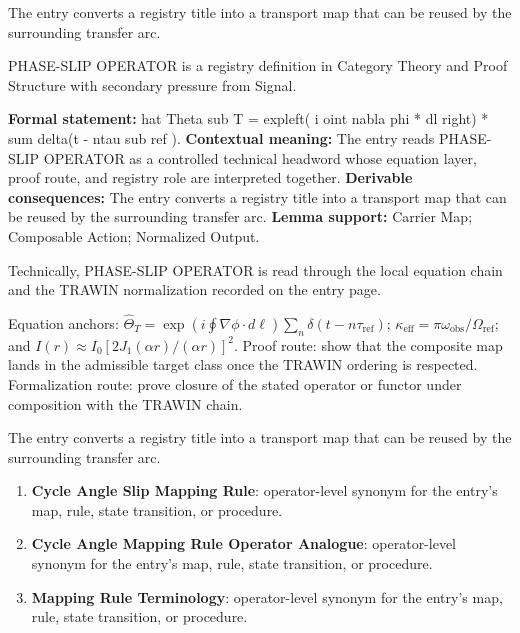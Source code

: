 The entry converts a registry title into a transport map that can be reused by the surrounding transfer arc.
\clearpage


\begingroup\small
{}
PHASE-SLIP OPERATOR is a registry definition in Category Theory and Proof Structure with secondary pressure from Signal.

\begingroup\footnotesize\setlength{\emergencystretch}{3em}\sloppy
\textbf{Formal statement:} hat Theta sub T = expleft( i oint nabla phi * dl right) * sum delta(t - ntau sub ref ). \textbf{Contextual meaning:} The entry reads PHASE-SLIP OPERATOR as a controlled technical headword whose equation layer, proof route, and registry role are interpreted together. \textbf{Derivable consequences:} The entry converts a registry title into a transport map that can be reused by the surrounding transfer arc. \textbf{Lemma support:} Carrier Map; Composable Action; Normalized Output.\par
\endgroup

Technically, PHASE-SLIP OPERATOR is read through the local equation chain and the TRAWIN normalization recorded on the entry page.

Equation anchors: \(\widehat{\Theta}_{T}=\exp(i\oint\nabla\phi\cdot d\ell)\sum_n\delta(t-n\tau_{\mathrm{ref}})\); \(\kappa_{\mathrm{eff}}=\pi\omega_{\mathrm{obs}}/\Omega_{\mathrm{ref}}\); and \(I(r)\approx I_0[2J_1(\alpha r)/(\alpha r)]^2\). Proof route: show that the composite map lands in the admissible target class once the TRAWIN ordering is respected. Formalization route: prove closure of the stated operator or functor under composition with the TRAWIN chain.

The entry converts a registry title into a transport map that can be reused by the surrounding transfer arc.
\endgroup

\begin{enumerate}[leftmargin=1.6em,itemsep=6pt,topsep=4pt]
\item \textbf{Cycle Angle Slip Mapping Rule}: operator-level synonym for the entry's map, rule, state transition, or procedure.
\item \textbf{Cycle Angle Mapping Rule Operator Analogue}: operator-level synonym for the entry's map, rule, state transition, or procedure.
\item \textbf{Mapping Rule Terminology}: operator-level synonym for the entry's map, rule, state transition, or procedure.
\end{enumerate}

